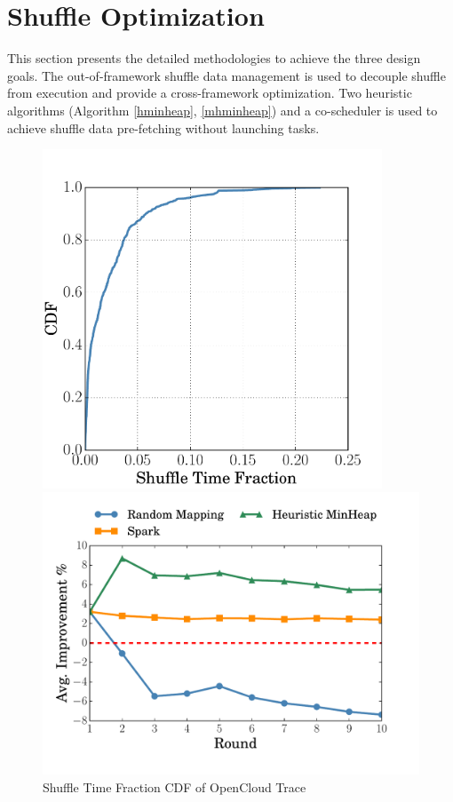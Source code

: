 \section{Shuffle Optimization}
\label{opt}
This section presents the detailed methodologies to achieve the three design goals. 
The out-of-framework shuffle data management is used to decouple shuffle from execution and provide a cross-framework optimization. 
Two heuristic algorithms (Algorithm \ref{hminheap}, \ref{mhminheap}) and a co-scheduler is used to achieve shuffle data pre-fetching without launching tasks.

\begin{figure}
    \centering
    \begin{minipage}{0.42\textwidth}
        \centering
        \includegraphics[width=0.9\textwidth]{fig/reduce_cdf} %
		\caption{Shuffle Time Fraction CDF of OpenCloud Trace}
		\label{fig:cdf}
    \end{minipage}\hfill
    \begin{minipage}{0.49\textwidth}
        \centering
        \includegraphics[width=\textwidth]{fig/sim} %

\end{minipage}
\end{figure}
